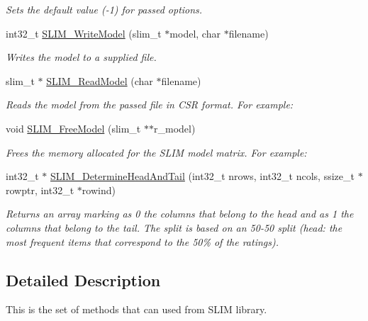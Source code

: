 \begin{DoxyCompactItemize}
\begin{DoxyCompactList}\small\item\em Sets the default value (-\/1) for passed options. \end{DoxyCompactList}\item 
int32\+\_\+t \mbox{\hyperlink{group__slimapi_ga4a73297a1dcf82ed110a1bb349120f2a}{S\+L\+I\+M\+\_\+\+Write\+Model}} (slim\+\_\+t $\ast$model, char $\ast$filename)
\begin{DoxyCompactList}\small\item\em Writes the model to a supplied file. \end{DoxyCompactList}\item 
slim\+\_\+t $\ast$ \mbox{\hyperlink{group__slimapi_ga6ee60da1ee298e093723e9dfd9f21f1c}{S\+L\+I\+M\+\_\+\+Read\+Model}} (char $\ast$filename)
\begin{DoxyCompactList}\small\item\em Reads the model from the passed file in C\+SR format. For example\+: \end{DoxyCompactList}\item 
void \mbox{\hyperlink{group__slimapi_ga2224ba0f1e06e728423bcf5c63da5fea}{S\+L\+I\+M\+\_\+\+Free\+Model}} (slim\+\_\+t $\ast$$\ast$r\+\_\+model)
\begin{DoxyCompactList}\small\item\em Frees the memory allocated for the S\+L\+IM model matrix. For example\+: \end{DoxyCompactList}\item 
int32\+\_\+t $\ast$ \mbox{\hyperlink{group__slimapi_ga05d2e5468a86da7251b57f4289701401}{S\+L\+I\+M\+\_\+\+Determine\+Head\+And\+Tail}} (int32\+\_\+t nrows, int32\+\_\+t ncols, ssize\+\_\+t $\ast$rowptr, int32\+\_\+t $\ast$rowind)
\begin{DoxyCompactList}\small\item\em Returns an array marking as 0 the columns that belong to the head and as 1 the columns that belong to the tail. The split is based on an 50-\/50 split (head\+: the most frequent items that correspond to the 50\% of the ratings). \end{DoxyCompactList}\end{DoxyCompactItemize}


\subsection{Detailed Description}
This is the set of methods that can used from S\+L\+IM library. 

